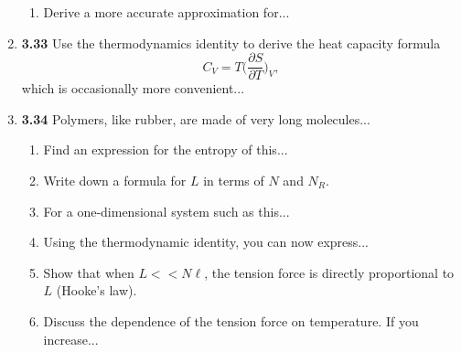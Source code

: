 \documentclass[fleqn]{article}
\begin{document}
\begin{enumerate}
\begin{enumerate}
      \item Derive a more accurate approximation for...


    \end{enumerate}


    \item \textbf{3.33} Use the thermodynamics identity to derive the heat capacity formula
    $$
      C_V=T \bigg( \dfrac{\partial S}{\partial T} \bigg)_V,
    $$
    which is occasionally more convenient...


    \item \textbf{3.34} Polymers, like rubber, are made of very long molecules...
    \begin{enumerate}
      \item Find an expression for the entropy of this...


      \item Write down a formula for $L$ in terms of $N$ and $N_R$.


      \item For a one-dimensional system such as this...


      \item Using the thermodynamic identity, you can now express...


      \item Show that when $L << N \ell$, the tension force is directly proportional to $L$ (Hooke's law).


      \item Discuss the dependence of the tension force on temperature. If you increase...


\end{enumerate}
\end{enumerate}
\end{document}
